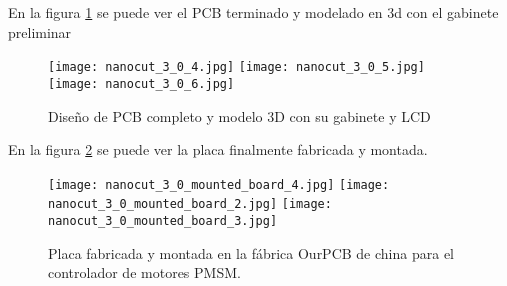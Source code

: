    En la figura \ref{fig:nanocut_3_0_2} se puede ver el PCB terminado y modelado en 3d con el gabinete preliminar
  \begin{figure}
      \begin{center}
         \texttt{[image: nanocut\_3\_0\_4.jpg]}
         \texttt{[image: nanocut\_3\_0\_5.jpg]}
         \texttt{[image: nanocut\_3\_0\_6.jpg]}
      \end{center}
      \caption{Diseño de PCB completo y modelo 3D con su gabinete y LCD}
      \label{fig:nanocut_3_0_2}
   \end{figure}

En la figura \ref{fig:nanocut_3_0_3} se puede ver la placa finalmente fabricada y montada.
  \begin{figure}
      \begin{center}
         \texttt{[image: nanocut\_3\_0\_mounted\_board\_4.jpg]}
         \texttt{[image: nanocut\_3\_0\_mounted\_board\_2.jpg]}
         \texttt{[image: nanocut\_3\_0\_mounted\_board\_3.jpg]}
      \end{center}
      \caption{Placa fabricada y montada en la fábrica OurPCB de china para el controlador de motores PMSM.}
      \label{fig:nanocut_3_0_3}
   \end{figure}
